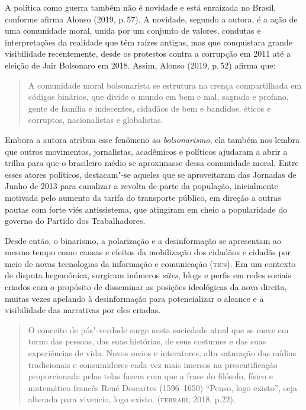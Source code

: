 A política como guerra também não é novidade e está enraizada no Brasil,
conforme afirma Alonso (2019, p.\,57). A novidade, segundo a autora, é a
ação de uma comunidade moral, unida por um conjunto de valores, condutas
e interpretações da realidade que têm raízes antigas, mas que
conquistara grande visibilidade recentemente, desde os protestos contra
a corrupção em 2011 até a eleição de Jair Bolsonaro em 2018. Assim,
Alonso (2019, p.\,52) afirma que:

\begin{quote}
A comunidade moral bolsonarista se estrutura na crença compartilhada em
códigos binários, que divide o mundo em bem e mal, sagrado e profano,
gente de família e indecentes, cidadãos de bem e bandidos, éticos e
corruptos, nacionalistas e globalistas.
\end{quote}

Embora a autora atribua esse fenômeno ao \textit{bolsonarismo}, ela também
nos lembra que outros movimentos, jornalistas, acadêmicos e políticos
ajudaram a abrir a trilha para que o brasileiro médio se aproximasse
dessa comunidade moral. Entre esses atores políticos, destacam"-se
aqueles que se aproveitaram das Jornadas de Junho de 2013 para canalizar
a revolta de parte da população, inicialmente motivada pelo aumento da
tarifa do transporte público, em direção a outras pautas com forte viés
antissistema, que atingiram em cheio a popularidade do governo do
Partido dos Trabalhadores.

Desde então, o binarismo, a polarização e a desinformação se apresentam
ao mesmo tempo como causas e efeitos da mobilização dos cidadãos e
cidadãs por meio de novas tecnologias da informação e comunicação
(\textsc{tic}s). Em um contexto de disputa hegemônica, surgiram inúmeros
\textit{sites}, blogs e perfis em redes sociais criados com o propósito de
disseminar as posições ideológicas da nova direita, muitas vezes
apelando à desinformação para potencializar o alcance e a visibilidade
das narrativas por eles criadas.

\begin{quote}
O conceito de pós"-verdade surge nesta sociedade atual que se move em
torno das pessoas, das suas histórias, de seus costumes e das suas
experiências de vida. Novos meios e interatores, alta saturação das
mídias tradicionais e consumidores cada vez mais imersos na
presentificação proporcionada pelas telas fazem com que a frase do
filósofo, físico e matemático francês René Descartes (1596--1650)
``Penso, logo existo'', seja alterada para vivencio, logo existo.
(\textsc{ferrari}, 2018, p.22).
\end{quote}

